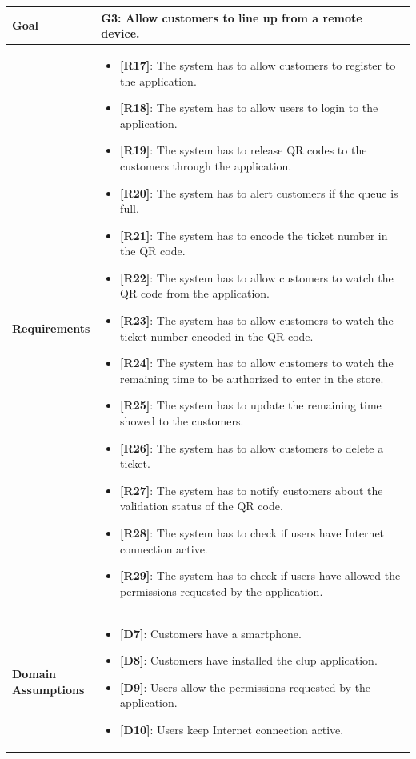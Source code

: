 \begin{table}[H]
\centering
\begin{tabular}{| m{} | m{} |} 
	\hline
	\textbf{Goal} &
		\textbf{G3: Allow customers to line up from a remote device.} \\
	\hline
	\textbf{Requirements} &
		\begin{itemize}
			\item {\textbf{[R17]}}: The system has to allow customers to register to the application.
			\item {\textbf{[R18]}}: The system has to allow users to login to the application.
			\item {\textbf{[R19]}}: The system has to release QR codes to the customers through the application.
			\item {\textbf{[R20]}}: The system has to alert customers if the queue is full.
			\item {\textbf{[R21]}}: The system has to encode the ticket number in the QR code.
			\item {\textbf{[R22]}}: The system has to allow customers to watch the QR code from the application.
			\item {\textbf{[R23]}}: The system has to allow customers to watch the ticket number encoded in the QR code.
			\item {\textbf{[R24]}}: The system has to allow customers to watch the remaining time to be authorized to enter in the store.
			\item {\textbf{[R25]}}: The system has to update the remaining time showed to the customers.
			\item {\textbf{[R26]}}: The system has to allow customers to delete a ticket.
			\item {\textbf{[R27]}}: The system has to notify customers about the validation status of the QR code.
			\item {\textbf{[R28]}}: The system has to check if users have Internet connection active.
			\item {\textbf{[R29]}}: The system has to check if users have allowed the permissions requested by the application.
		\end{itemize} \\ 
	\hline
	\shortstack[l]{\textbf{Domain} \\ \textbf{Assumptions}} & 
		\begin{itemize}
			\item {\textbf{[D7]}}: Customers have a smartphone.
			\item {\textbf{[D8]}}: Customers have installed the \gls{clup} application.
			\item {\textbf{[D9]}}: Users allow the permissions requested by the application.
			\item {\textbf{[D10]}}: Users keep Internet connection active.
		\end{itemize} \\ 
	\hline
\end{tabular}
\end{table}

